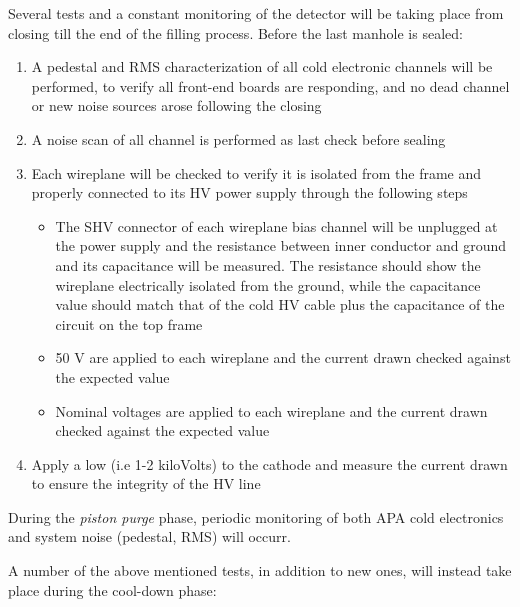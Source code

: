 Several tests and a constant monitoring of the detector will be taking place from  closing till the end of the filling process.
Before the last manhole is sealed:
\begin{enumerate}

    \item A pedestal and RMS characterization of all cold electronic channels will be performed, to verify all  front-end boards are responding, and no dead channel or new noise sources arose following the  closing
    
    \item A noise scan of all  channel is performed as last check before sealing

    \item Each  wireplane will be checked to verify it is isolated from the  frame and properly connected to its HV power supply through the following steps
    
\begin{itemize}

    \item The SHV connector of each wireplane bias channel will be unplugged at the power supply and the resistance between inner conductor and ground and its capacitance will be measured. The resistance should show the wireplane electrically isolated from the ground, while the capacitance value should match that of the cold HV cable plus the capacitance of the circuit on the  top frame

    \item 50 V are applied to each wireplane and the current drawn checked against the expected value
    
    \item Nominal voltages are applied to each wireplane and the current drawn checked against the expected value 
    
\end{itemize}

    \item Apply a low (i.e 1-2 kiloVolts) to the cathode and measure the current drawn to ensure the integrity of the HV line

\end{enumerate}

During the \textit{piston purge} phase, periodic monitoring of both APA cold electronics and  system noise (pedestal, RMS) will occurr.

A number of the above mentioned tests, in addition to new ones, will instead take place during the cool-down phase:


